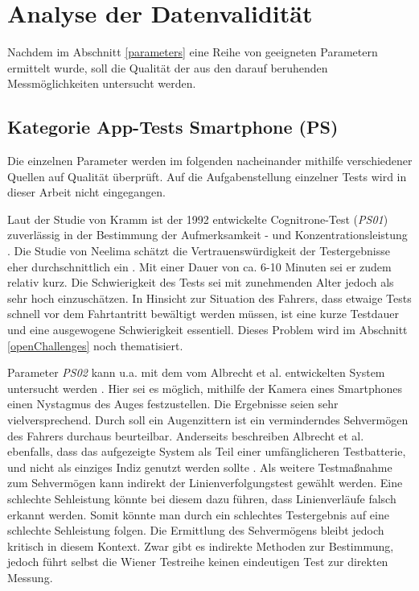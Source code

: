 \section{Analyse der Datenvalidität}
\label{dataValidity}
Nachdem im Abschnitt \ref{parameters} eine Reihe von geeigneten Parametern ermittelt wurde, soll die Qualität der aus den darauf beruhenden Messmöglichkeiten untersucht werden.

\subsection{Kategorie App-Tests Smartphone (PS)}

Die einzelnen Parameter werden im folgenden nacheinander mithilfe verschiedener Quellen auf Qualität überprüft. Auf die Aufgabenstellung einzelner Tests wird in dieser Arbeit nicht eingegangen. 

Laut der Studie von Kramm ist der 1992 entwickelte Cognitrone-Test (\textit{PS01}) zuverlässig in der Bestimmung der Aufmerksamkeit - und Konzentrationsleistung \cite{studieaufmerksamkeitstests}. Die Studie von Neelima schätzt die Vertrauenswürdigkeit der Testergebnisse eher durchschnittlich ein \cite{indiaassessment}. Mit einer Dauer von ca. 6-10 Minuten sei er zudem relativ kurz. Die Schwierigkeit des Tests sei mit zunehmenden Alter jedoch als sehr hoch einzuschätzen. In Hinsicht zur Situation des Fahrers, dass etwaige Tests schnell vor dem Fahrtantritt bewältigt werden müssen, ist eine kurze Testdauer und eine ausgewogene Schwierigkeit essentiell. Dieses Problem wird im Abschnitt \ref{openChallenges} noch thematisiert.

Parameter \textit{PS02} kann u.a. mit dem vom Albrecht et al. entwickelten System untersucht werden \cite{mobilesmarttracking}. Hier sei es möglich, mithilfe der Kamera eines Smartphones einen Nystagmus des Auges festzustellen. Die Ergebnisse seien sehr vielversprechend. Durch soll ein Augenzittern ist ein verminderndes Sehvermögen des Fahrers durchaus beurteilbar. Anderseits beschreiben Albrecht et al. ebenfalls, dass das aufgezeigte System als Teil einer umfänglicheren Testbatterie, und nicht als einziges Indiz genutzt werden sollte \cite{mobilesmarttracking}. Als weitere Testmaßnahme zum Sehvermögen kann indirekt der Linienverfolgungstest gewählt werden. Eine schlechte Sehleistung könnte bei diesem dazu führen, dass Linienverläufe falsch erkannt werden. Somit könnte man durch ein schlechtes Testergebnis auf eine schlechte Sehleistung folgen. Die Ermittlung des Sehvermögens bleibt jedoch kritisch in diesem Kontext. Zwar gibt es indirekte Methoden zur Bestimmung, jedoch führt selbst die Wiener Testreihe keinen eindeutigen Test zur direkten Messung.

